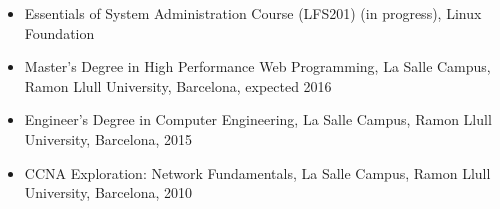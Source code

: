 \begin{itemize}

    \item Essentials of System Administration Course (LFS201) (in progress), Linux Foundation

    \item Master's Degree in High Performance Web Programming, La Salle Campus, Ramon Llull University, Barcelona, expected 2016

    \item Engineer's Degree in Computer Engineering, La Salle Campus, Ramon Llull University, Barcelona, 2015

    \item CCNA Exploration: Network Fundamentals, La Salle Campus, Ramon Llull University, Barcelona, 2010

\end{itemize}
